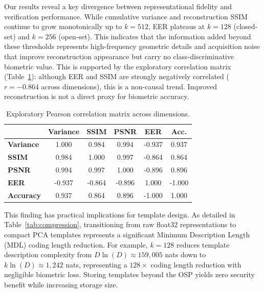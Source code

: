 \documentclass[conference]{IEEEtran}
\begin{document}
Our results reveal a key divergence between representational fidelity and verification performance. While cumulative variance and reconstruction SSIM continue to grow monotonically up to $k=512$, EER plateaus at $k=128$ (closed-set) and $k=256$ (open-set). This indicates that the information added beyond these thresholds represents high-frequency geometric details and acquisition noise that improve reconstruction appearance but carry no class-discriminative biometric value. This is supported by the exploratory correlation matrix (Table~\ref{tab:correlation}): although EER and SSIM are strongly negatively correlated ($r = -0.864$ across dimensions), this is a non-causal trend. Improved reconstruction is not a direct proxy for biometric accuracy.

\begin{table}[h]
\centering
\caption{Exploratory Pearson correlation matrix across dimensions.}
\label{tab:correlation}
\begin{tabular}{@{}lccccc@{}}
\toprule
 & \textbf{Variance} & \textbf{SSIM} & \textbf{PSNR} & \textbf{EER} & \textbf{Acc.} \\
\midrule
\textbf{Variance} & 1.000 & 0.984 & 0.994 & -0.937 & 0.937 \\
\textbf{SSIM}     & 0.984 & 1.000 & 0.997 & -0.864 & 0.864 \\
\textbf{PSNR}     & 0.994 & 0.997 & 1.000 & -0.896 & 0.896 \\
\textbf{EER}      & -0.937 & -0.864 & -0.896 & 1.000 & -1.000 \\
\textbf{Accuracy} & 0.937 & 0.864 & 0.896 & -1.000 & 1.000 \\
\bottomrule
\end{tabular}
\end{table}

This finding has practical implications for template design. As detailed in Table~\ref{tab:compression}, transitioning from raw float32 representations to compact PCA templates represents a significant Minimum Description Length (MDL) coding length reduction. For example, $k=128$ reduces template description complexity from $D \ln(D) \approx 159,005$ nats down to $k \ln(D) \approx 1,242$ nats, representing a $128\times$ coding length reduction with negligible biometric loss. Storing templates beyond the OSP yields zero security benefit while increasing storage size.
\end{document}
